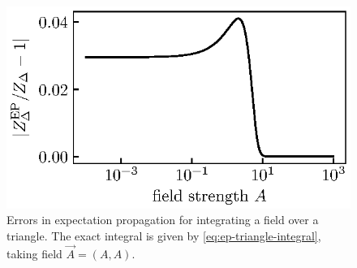 \documentclass[11pt,twoside]{report}
\begin{document}
\begin{figure}
  \includegraphics[width=0.9\linewidth,outer]{ep-errors}
  \caption[Errors in expectation propagation for integrating a field over a triangle]{
    Errors in expectation propagation for integrating a field over a triangle.
    The exact integral is given by \eqref{eq:ep-triangle-integral}, taking field $\vec{A} = (A, A)$.
  }
  \label{fig:ep-errors}
\end{figure}
\end{document}
